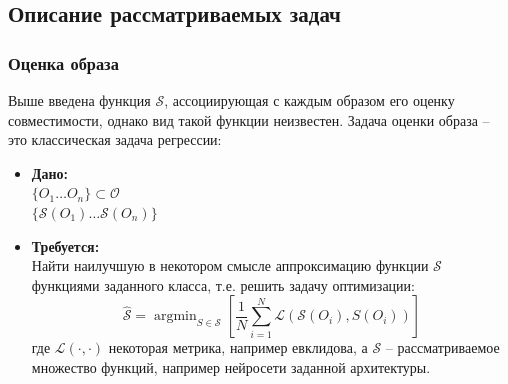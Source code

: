 \documentclass[a4paper,12pt]{article}
\DeclareMathOperator*{\argmin}{argmin}
\begin{document}
		\subsection{Описание рассматриваемых задач}
			\subsubsection{Оценка образа}
				Выше введена функция $\mathcal{S}$, ассоциирующая с каждым образом его оценку совместимости, однако вид такой функции неизвестен. Задача оценки образа -- это классическая задача регрессии:\\
				\begin{itemize}
					\item \textbf{Дано:}\\
						$\{O_1\dots O_n\}\subset \mathcal{O}$\\
						$\{\mathcal{S}(O_1)\dots\mathcal{S}(O_n)\}$
					\item \textbf{Требуется:}\\
					Найти наилучшую в некотором смысле аппроксимацию функции $\mathcal{S}$ функциями заданного класса, т.е. решить задачу оптимизации:\\
					$$\hat{\mathcal{S}}= \argmin_{S\in\mathscr{S}}\left[\frac{1}{N} \sum\limits_{i=1}^N\mathcal{L}(\mathcal{S}(O_i), S(O_i))\right]$$
					где $\mathcal{L}(\cdot, \cdot)$ некоторая метрика, например евклидова, а $\mathscr{S}$ -- рассматриваемое множество функций, например нейросети заданной архитектуры.
					
				\end{itemize}
				
			
\end{document}
